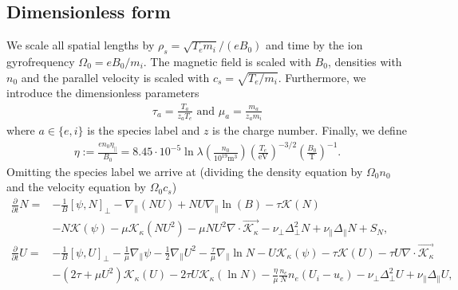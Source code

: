 \subsection{Dimensionless form}
We scale all spatial lengths by $\rho_s = \sqrt{T_e m_i}/(eB_0)$ and time by the ion gyrofrequency $\Omega_0 = eB_0/m_i$.
The magnetic field is scaled with $B_0$, densities with $n_0$ and the parallel velocity is scaled with $c_s = \sqrt{T_e/m_i}$.
Furthermore, we introduce the dimensionless parameters
\begin{align}
  \tau_a = \frac{T_a}{z_aT_e} \text{ and } \mu_a = \frac{m_a}{z_am_i}
  \label{}
\end{align}
where $a\in\{e,i\}$ is the species label and $z$ is the charge number. Finally, we define
\begin{align}
  \eta:=\frac{en_0\eta_\parallel}{B_0} = 8.45\cdot 10^{-5}\ln \lambda \left(\frac{n_0}{10^{19}\text{m}^3}\right) \left(\frac{T_e}{\text{eV}}\right)^{-3/2} \left(\frac{B_0}{\text{T}}\right)^{-1}.
    \label{eq:resistivity}
\end{align}
Omitting the species label we arrive at (dividing the density equation by $\Omega_0n_0$ and the velocity equation by $\Omega_0 c_s$)
\begin{subequations}
    \begin{align}
    \frac{\partial}{\partial t} N =&
        - \frac{1}{B}[\psi, N]_{\perp}%
        - \nabla_\parallel \left( NU\right)
        + NU\nabla_\parallel\ln(B)
        - \tau \mathcal K(N) \nonumber \\&
        - N \mathcal K(\psi)
        -\mu \mathcal K_\kappa(NU^2)
        -\mu NU^2\nabla\cdot \vec{ \mathcal K_\kappa}
        - \nu_\perp\Delta_\perp^2 N + \nu_\parallel \Delta_\parallel N + S_N, \\
    \frac{\partial}{\partial t} U =&
        - \frac{1}{B}\left[\psi, U\right]_{\perp}%
        - \frac{1}{\mu} \nabla_\parallel \psi%
        - \frac{1}{2}\nabla_\parallel U^2
        -\frac{\tau}{\mu} \nabla_\parallel \ln N
        - U\mathcal K_\kappa(\psi)
        - \tau \mathcal K(U)
        -\tau U\nabla\cdot\vec{ \mathcal K_\kappa}\nonumber\\&
        - \left(2\tau + {\mu}U^2\right) \mathcal K_\kappa (U)
        -2\tau U\mathcal K_\kappa(\ln N)
        - \frac{\eta}{\mu} \frac{n_e}{N}n_e(U_i - u_e)
        - \nu_\perp\Delta_\perp^2 U + \nu_\parallel \Delta_\parallel U ,
        \label{eq:EgyrofluidU}
    \end{align}
    \label{eq:Egyrofluid}
\end{subequations}
